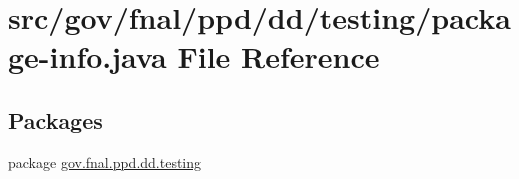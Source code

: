 \hypertarget{gov_2fnal_2ppd_2dd_2testing_2package-info_8java}{\section{src/gov/fnal/ppd/dd/testing/package-\/info.java File Reference}
\label{gov_2fnal_2ppd_2dd_2testing_2package-info_8java}
}
\subsection*{Packages}
\begin{DoxyCompactItemize}
\item 
package \hyperlink{namespacegov_1_1fnal_1_1ppd_1_1dd_1_1testing}{gov.\-fnal.\-ppd.\-dd.\-testing}
\end{DoxyCompactItemize}
